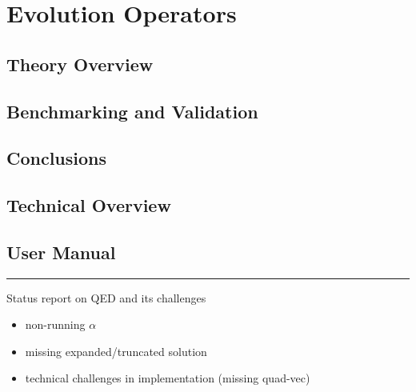 
\chapter{Evolution Operators}
\label{ch:eko}
\minitoc
\adjustmtc



\section{Theory Overview}
\label{sec:eko/theory}


\section{Benchmarking and Validation}
\label{sec:eko/pheno}


\section{Conclusions}
\label{sec:eko/concl}


\section{Technical Overview}
\label{app:eko/code}


\section{User Manual}
\label{app:eko/man}


\vspace*{20pt}
\noindent
\rule{\hsize}{1pt}

Status report on QED and its challenges

\begin{itemize}
	\item non-running $\alpha$
	\item missing expanded/truncated solution
	\item technical challenges in implementation (missing quad-vec)
\end{itemize}
